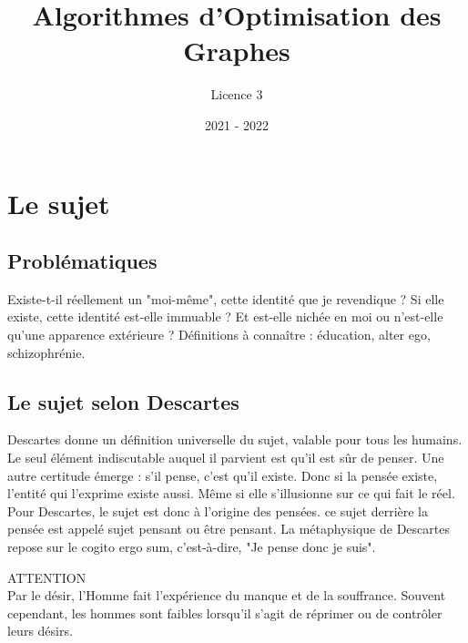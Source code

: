 \documentclass{article}%
\title{Algorithmes d'Optimisation des Graphes}%
\author{Licence 3}%
\date{2021 {-} 2022}%
\begin{document}
%
\normalsize%
\maketitle%
\tableofcontents%
\newpage%
\section{Le sujet}%
\label{sec:Lesujet}%

%
\subsection{Problématiques}%
\label{subsec:Problmatiques}%
Existe{-}t{-}il réellement un "moi{-}même", cette identité que je revendique ?%
\newline%
\newline%
Si elle existe, cette identité est{-}elle immuable ?%
\newline%
\newline%
Et est{-}elle nichée en moi ou n'est{-}elle qu'une apparence extérieure ?%
\newline%
\newline%
Définitions à connaître : éducation, alter ego, schizophrénie.

%
\subsection{Le sujet selon Descartes}%
\label{subsec:LesujetselonDescartes}%
Descartes donne un définition universelle du sujet, valable pour tous les humains. Le seul élément indiscutable auquel il parvient est qu'il est sûr de penser. Une autre certitude émerge : s'il pense, c'est qu'il existe. Donc si la pensée existe, l'entité qui l'exprime existe aussi. Même si elle s'illusionne sur ce qui fait le réel. Pour Descartes, le sujet est donc à l'origine des pensées. ce sujet derrière la pensée est appelé sujet pensant ou être pensant. La métaphysique de Descartes repose sur le cogito ergo sum, c'est{-}à{-}dire, "Je pense donc je suis".

\begin{tcolorbox}[colframe=danger, colback=danger-bg]
{ \footnotesize \textcolor{danger}{ATTENTION}}
\\ Par le désir, l'Homme fait l'expérience du manque et de la souffrance. Souvent cependant, les hommes sont faibles lorsqu'il s'agit de réprimer ou de contrôler leurs désirs.
\end{tcolorbox}

%
\end{document}
